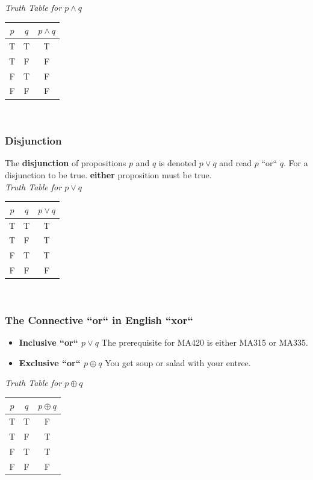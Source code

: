 \documentclass{article}
\begin{document}
\textit{Truth Table for $ p \land q $} 
\begin{tabular}{|c|c|c|}
\hline
$ p $ & $ q $ & $ p \land q $ \\
\hline
T & T & T \\
T & F & F \\
F & T & F \\
F & F & F \\
\hline
\end{tabular}\\


\subsubsection{Disjunction}
The \textbf{disjunction} of propositions $ p $ and $ q $ is denoted $ p \lor q $ and read $ p $ ``or`` $ q $.
For a disjunction to be true. \textbf{either} proposition must be true.\\


\textit{Truth Table for $ p \lor q $}
\begin{tabular}{|c|c|c|}
\hline
$ p $ & $ q $ & $ p \lor q $ \\
\hline
T & T & T \\ 
T & F & T \\
F & T & T \\
F & F & F \\
\hline
\end{tabular}\\


\subsubsection{The Connective ``or`` in English ``xor``}
\begin{itemize}
	\item \textbf{Inclusive ``or`` $ p \lor q $}
	The prerequisite for MA420 is either MA315 or MA335.
	\item \textbf{Exclusive ``or`` $ p \oplus q $}
	You get soup or salad with your entree.
\end{itemize}


\textit{Truth Table for $ p \oplus q $}
\begin{tabular}{|c|c|c|}
\hline
$ p $ & $ q $ & $ p \oplus q $ \\
\hline
T & T & F \\ 
T & F & T \\
F & T & T \\
F & F & F \\
\hline
\end{tabular}\\
\end{document}
